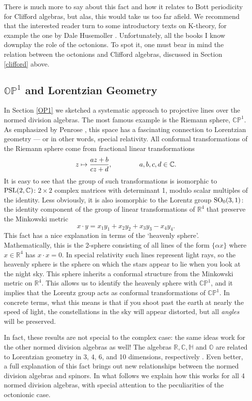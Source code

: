 \documentclass[12pt]{article}
\newcommand\R{{\mathbb R}}
\newcommand\C{{\mathbb C}}
\renewcommand\H{{\mathbb H}}
\renewcommand\O{{\mathbb O}}
\newcommand\CP{{\mathbb {CP}}}
\newcommand\OP{{\mathbb {OP}}}
\newcommand{\SO}{{\rm SO}}
\newcommand{\PSL}{{\rm PSL}}
\begin{document}
There is much more to say about this fact and how it relates to Bott
periodicity for Clifford algebras, but alas, this would take us too far
afield.  We recommend that the interested reader turn to some
introductory texts on K-theory, for example the one by Dale Husemoller
\cite{Husemoller}.  Unfortunately, all the books I know downplay the
role of the octonions.  To spot it, one must bear in mind the relation 
between the octonions and Clifford algebras, discussed in Section
\ref{clifford} above.
 
\subsection{$\OP^1$ and Lorentzian Geometry}  \label{lorentz} 
 
In Section \ref{OP1} we sketched a systematic approach to projective 
lines over the normed division algebras.  The most famous example is the 
Riemann sphere, $\CP^1$.  As emphasized by Penrose \cite{PR}, this space 
has a fascinating connection to Lorentzian geometry --- or in other words, 
special relativity.  All conformal transformations of the Riemann 
sphere come from fractional linear transformations   
\[        z \mapsto {az + b\over cz + d}, \qquad \qquad a,b,c,d \in \C.  \] 
It is easy to see that the group of such transformations is isomorphic 
to $\PSL(2,\C)$: $2 \times 2$ complex matrices with determinant 1,  
modulo scalar multiples of the identity.  Less obviously, it is also 
isomorphic to the Lorentz group $\SO_0(3,1)$: the identity component of 
the group of linear transformations of $\R^4$ that preserve the 
Minkowski metric 
\[     x \cdot y = x_1 y_1 + x_2 y_2 + x_3 y_3 - x_4 y_4 .\] 
This fact has a nice explanation in terms of the `heavenly sphere'.  
Mathematically, this is the 2-sphere consisting of all lines of the form 
$\{\alpha x\}$ where $x \in \R^4$ has $x \cdot x = 0$.  In special 
relativity such lines represent light rays, so the heavenly sphere is 
the sphere on which the stars appear to lie when you look at the night 
sky.  This sphere inherits a conformal structure from the Minkowski 
metric on $\R^4$.  This allows us to identify the heavenly sphere with 
$\CP^1$, and it implies that the Lorentz group acts as conformal 
transformations of $\CP^1$.  In concrete terms, what this means is that 
if you shoot past the earth at nearly the speed of light, the 
constellations in the sky will appear distorted, but all {\it angles} 
will be preserved. 
 
In fact, these results are not special to the complex case: the same
ideas work for the other normed division algebras as well!  The algebras
$\R, \C, \H$ and $\O$ are related to Lorentzian geometry in 3, 4, 6, and
10 dimensions, respectively \cite{MD,MS,MS2,Schray,Sudbery}.  Even
better, a full explanation of this fact brings out new relationships
between the normed division algebras and spinors.  In what follows we
explain how this works for all 4 normed division algebras, with special
attention to the peculiarities of the octonionic case.
 
\end{document}
